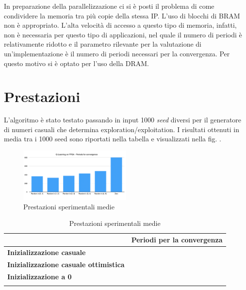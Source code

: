 \documentclass{article}
\begin{document}
In preparazione della parallelizzazione ci si è posti il problema di come condividere la memoria tra più copie della stessa IP. 
L'uso di blocchi di BRAM non è appropriato. 
L'alta velocità di accesso a questo tipo di memoria, infatti, non è necessaria per questo tipo di applicazioni, nel quale il numero di periodi è relativamente ridotto e il parametro rilevante per la valutazione di un'implementazione è il numero di periodi necessari per la convergenza.
Per questo motivo si è optato per l'uso della DRAM.

\section{Prestazioni}
L'algoritmo è stato testato passando in input 1000 \emph{seed} diversi per il generatore di numeri casuali che determina exploration/exploitation.
I risultati ottenuti in media tra i 1000 seed sono riportati nella tabella  e visualizzati nella fig. .

\begin{figure}[h!]

\centering


\includegraphics[width=0.5\textwidth]{perf.png}
\caption{Prestazioni sperimentali medie}
\label{fig:perf}
\end{figure}

\begin{table}[h!]

\centering


\begin{tabular}{|
	>{\columncolor[HTML]{EFEFEF}}l |l|}
	\hline
	& \cellcolor[HTML]{EFEFEF}\textbf{Periodi per la convergenza} \\ \hline
	\textbf{Inizializzazione casuale}             &                                                                 \\ \hline
	\textbf{Inizializzazione casuale ottimistica} &                                                                 \\ \hline
	\textbf{Inizializzazione a 0}                 &                                                                 \\ \hline
	\textbf{}                                     &                                                                 \\ \hline
	\end{tabular}
	\caption{Prestazioni sperimentali medie}
	\label{table:perf}
	\end{table}
\end{document}
